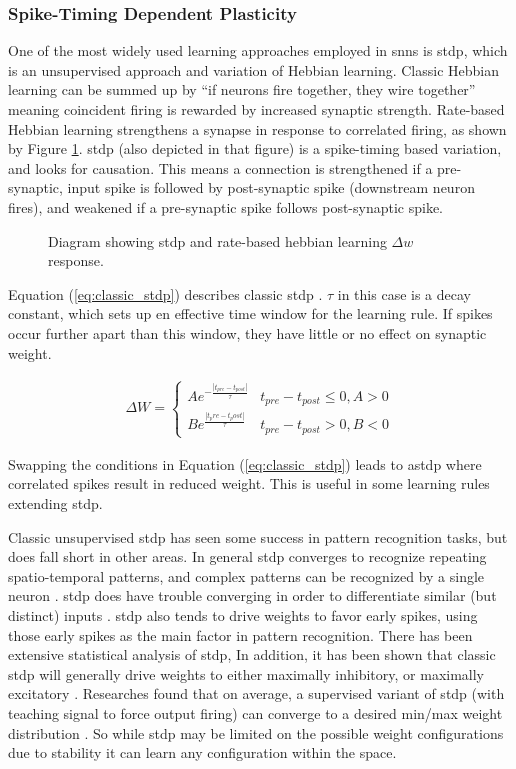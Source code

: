 \documentclass[conference]{IEEEtran}
\newcommand{\asvgf}[4]{
	\begin{figure}[htbp]
    	\centering
		\adjustbox{max width=#4\linewidth}{}
        \caption{#2.}
        \label{#3}
	\end{figure}
}
\newcommand{\eq}[1]{Equation (\ref{#1})}
\begin{document}
\subsubsection{Spike-Timing Dependent Plasticity}
One of the most widely used learning approaches employed in \glspl{snn} is
\gls{stdp}, which is an unsupervised approach and variation of Hebbian
learning. Classic Hebbian learning can be summed up by ``if neurons fire
together, they wire together'' meaning coincident firing is rewarded by
increased synaptic strength. Rate-based Hebbian learning strengthens a
synapse in response to correlated firing, as shown by Figure
\ref{fig:heb_rate_stdp}. \Gls{stdp} (also depicted in that figure) is a
spike-timing based variation, and looks for causation. This means a
connection is strengthened if a pre-synaptic, input spike is followed by
post-synaptic spike (downstream neuron fires), and weakened if a
pre-synaptic spike follows post-synaptic spike.

\asvgf{figures/heb_diagrams.svg}{Diagram showing \gls{stdp} and rate-based
  hebbian learning $\Delta w$ response}{fig:heb_rate_stdp}{0.6}

\eq{eq:classic_stdp} describes classic \gls{stdp}
\parencite{tavanaei_2019}. $\tau$ in this case is a decay constant, which
sets up en effective time window for the learning rule. If spikes occur
further apart than this window, they have little or no effect on synaptic
weight.

\begin{align}
  \Delta W =
  \begin{cases}
    Ae^{-\frac{|t_{pre}-t_{post}|}{\tau}} & t_{pre} - t_{post} \leq 0, A > 0
    \\ Be^{\frac{|t_pre-t_post|}{\tau}} & t_{pre} - t_{post} > 0, B < 0
  \end{cases} \label{eq:classic_stdp}
\end{align}

Swapping the conditions in \eq{eq:classic_stdp} leads to
\gls{astdp} where correlated spikes result in reduced weight. This
is useful in some learning rules extending \gls{stdp}.

Classic unsupervised \gls{stdp} has seen some success in pattern recognition
tasks, but does fall short in other areas. In general \gls{stdp} converges to
recognize repeating spatio-temporal patterns, and complex patterns can be
recognized by a single neuron \parencite{tavanaei_2019}. \Gls{stdp} does have
trouble converging in order to differentiate similar (but distinct) inputs
\parencite{vigneron_2020}. \Gls{stdp} also tends to drive weights to favor early
spikes, using those early spikes as the main factor in pattern
recognition. There has been extensive statistical analysis of \gls{stdp}, In
addition, it has been shown that classic \gls{stdp} will generally drive weights
to either maximally inhibitory, or maximally excitatory
\parencite{legenstein_2005}. Researches found that on average, a
supervised variant of \gls{stdp} (with teaching signal to force output firing)
can converge to a desired min/max weight distribution
\parencite{legenstein_2005}. So while \gls{stdp} may be limited on the possible
weight configurations due to stability it can learn any configuration within the
space.
\end{document}
